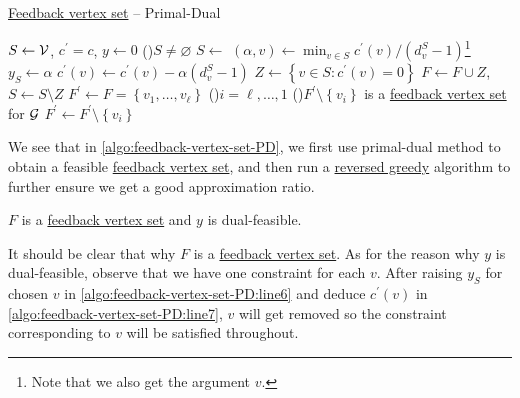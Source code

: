 \begin{algorithm}[H]\label{algo:feedback-vertex-set-PD}
	\DontPrintSemicolon
	\caption{\hyperref[prb:feedback-vertex-set]{Feedback vertex set} -- Primal-Dual}
	\BlankLine

	\(S\gets \mathcal{\MakeUppercase{v}} \), \(c^\prime = c\), \(y\gets 0\)
	\;
	\While(){\(S \neq \varnothing \)}{
		\(S\gets\) 
		\((\alpha, v) \gets \min _{v\in S} c^\prime (v) / (d_v^S - 1)\)\footnote{Note that we also get the argument \(v\).}
		\(y_S\gets \alpha\)\label{algo:feedback-vertex-set-PD:line6}\;
		\(c^\prime (v)\gets c^\prime (v) - \alpha (d_v^S - 1)\)\label{algo:feedback-vertex-set-PD:line7}\;
		\(Z\gets \left\{ v\in S\colon c^\prime (v) = 0 \right\} \)\;
		\(F\gets F\cup Z\), \(S\gets S \setminus Z\)\;
	}
	\;
	\(F^\prime \gets F = \left\{ v_1, \ldots , v_{\ell} \right\} \)
	\For(\label{algo:feedback-vertex-set-PD:for}){\(i = \ell , \ldots  , 1\)}{
		\If(){\(F^\prime \setminus \left\{ v_i \right\}\) is a \hyperref[prb:feedback-vertex-set]{feedback vertex set} for \(\mathcal{\MakeUppercase{g}} \)}{
			\(F^\prime \gets F^\prime \setminus \left\{ v_i \right\} \)\;
		}
	}
	\;
\end{algorithm}

We see that in \autoref{algo:feedback-vertex-set-PD}, we first use primal-dual method to obtain a feasible \hyperref[prb:feedback-vertex-set]{feedback vertex set}, and then run a \hyperref[rmk:reversed-greedy]{reversed greedy} algorithm to further ensure we get a good approximation ratio.

\begin{claim}
	\(F\) is a \hyperref[prb:feedback-vertex-set]{feedback vertex set} and \(y\) is dual-feasible.
\end{claim}
\begin{explanation}
	It should be clear that why \(F\) is a \hyperref[prb:feedback-vertex-set]{feedback vertex set}. As for the reason why \(y\) is dual-feasible, observe that we have one constraint for each \(v\). After raising \(y_S\) for chosen \(v\) in \autoref{algo:feedback-vertex-set-PD:line6} and deduce \(c^\prime (v)\) in \autoref{algo:feedback-vertex-set-PD:line7}, \(v\) will get removed so the constraint corresponding to \(v\) will be satisfied throughout.
\end{explanation}

